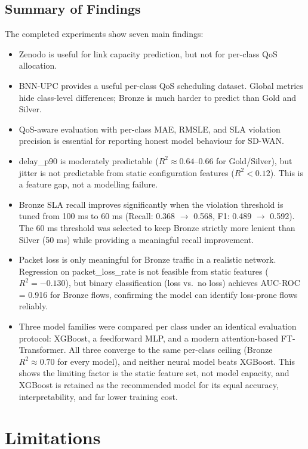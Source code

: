 \documentclass[a4paper,12pt]{Classes/RoboticsLaTeX}
\begin{document}
\section{Summary of Findings}

The completed experiments show seven main findings:

\begin{itemize}
    \item Zenodo is useful for link capacity prediction, but not for per-class QoS allocation.
    \item BNN-UPC provides a useful per-class QoS scheduling dataset. Global metrics hide class-level differences; Bronze is much harder to predict than Gold and Silver.
    \item QoS-aware evaluation with per-class MAE, RMSLE, and SLA violation precision is essential for reporting honest model behaviour for SD-WAN.
    \item delay\_p90 is moderately predictable ($R^2 \approx 0.64$--0.66 for Gold/Silver), but jitter is not predictable from static configuration features ($R^2 < 0.12$). This is a feature gap, not a modelling failure.
    \item Bronze SLA recall improves significantly when the violation threshold is tuned from 100 ms to 60 ms (Recall: 0.368 $\rightarrow$ 0.568, F1: 0.489 $\rightarrow$ 0.592). The 60 ms threshold was selected to keep Bronze strictly more lenient than Silver (50 ms) while providing a meaningful recall improvement.
    \item Packet loss is only meaningful for Bronze traffic in a realistic network. Regression on packet\_loss\_rate is not feasible from static features ($R^2 = -0.130$), but binary classification (loss vs.\ no loss) achieves AUC-ROC = 0.916 for Bronze flows, confirming the model can identify loss-prone flows reliably.
    \item Three model families were compared per class under an identical evaluation protocol: XGBoost, a feedforward MLP, and a modern attention-based FT-Transformer. All three converge to the same per-class ceiling (Bronze $R^2 \approx 0.70$ for every model), and neither neural model beats XGBoost. This shows the limiting factor is the static feature set, not model capacity, and XGBoost is retained as the recommended model for its equal accuracy, interpretability, and far lower training cost.
\end{itemize}

\chapter{Limitations}
\label{chap:limitations}
\end{document}

